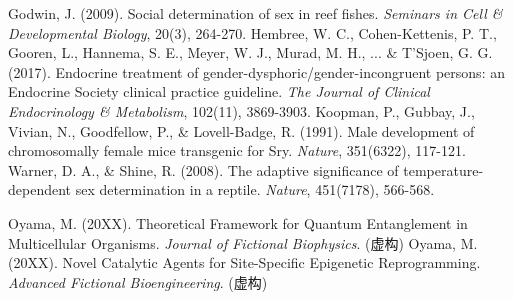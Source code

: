 
\begin{thebibliography}{99} %

 Godwin, J. (2009). Social determination of sex in reef fishes. \textit{Seminars in Cell \& Developmental Biology}, 20(3), 264-270.
 Hembree, W. C., Cohen-Kettenis, P. T., Gooren, L., Hannema, S. E., Meyer, W. J., Murad, M. H., ... \& T'Sjoen, G. G. (2017). Endocrine treatment of gender-dysphoric/gender-incongruent persons: an Endocrine Society clinical practice guideline. \textit{The Journal of Clinical Endocrinology \& Metabolism}, 102(11), 3869-3903.
 Koopman, P., Gubbay, J., Vivian, N., Goodfellow, P., \& Lovell-Badge, R. (1991). Male development of chromosomally female mice transgenic for Sry. \textit{Nature}, 351(6322), 117-121.
 Warner, D. A., \& Shine, R. (2008). The adaptive significance of temperature-dependent sex determination in a reptile. \textit{Nature}, 451(7178), 566-568.

 Oyama, M. (20XX). Theoretical Framework for Quantum Entanglement in Multicellular Organisms. \textit{Journal of Fictional Biophysics}. (虚构)
 Oyama, M. (20XX). Novel Catalytic Agents for Site-Specific Epigenetic Reprogramming. \textit{Advanced Fictional Bioengineering}. (虚构)


\end{thebibliography}
